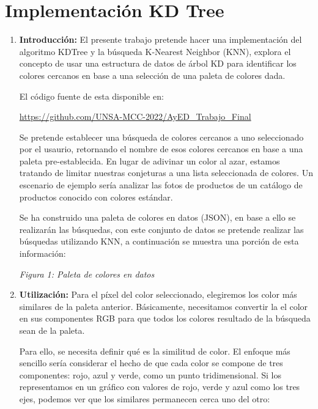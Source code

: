 \documentclass{article}
\begin{document}
	\section{Implementación KD Tree}\label{sec:trabajo}
	\begin{enumerate}
        
        \item \textbf{Introducción:}  El presente trabajo pretende hacer una implementación del algoritmo KDTree y la búsqueda K-Nearest Neighbor (KNN), explora el concepto de usar una estructura de datos de árbol KD para identificar los colores cercanos en base a una selección de una paleta de colores dada.

        El código fuente de esta disponible en: 
        
        \begin{center}
	        \url{https://github.com/UNSA-MCC-2022/AyED_Trabajo_Final}
	    \end{center}

        Se pretende establecer una búsqueda de colores cercanos a uno seleccionado por el usaurio, retornando el nombre de esos colores cercanos en base a una paleta pre-establecida. En lugar de adivinar un color al azar, estamos tratando de limitar nuestras conjeturas a una lista seleccionada de colores. Un escenario de ejemplo sería analizar las fotos de productos de un catálogo de productos conocido con colores estándar.
        
        Se ha construido una paleta de colores en datos (JSON), en base a ello se realizarán las búsquedas, con este conjunto de datos se pretende realizar las búsquedas utilizando KNN, a continuación se muestra una porción de esta información:
        
        \begin{center}
            \par
            \textit{Figura 1: Paleta de colores en datos}
        \end{center}
        
        \item \textbf{Utilización:}  Para el píxel del color seleccionado, elegiremos los color más similares de la paleta anterior. Básicamente, necesitamos convertir la el color en sus componentes RGB para que todos los colores resultado de la búsqueda sean de la paleta.

        Para ello, se necesita definir qué es la similitud de color. El enfoque más sencillo sería considerar el hecho de que cada color se compone de tres componentes: rojo, azul y verde, como un punto tridimensional. Si los representamos en un gráfico con valores de rojo, verde y azul como los tres ejes, podemos ver que los similares permanecen cerca uno del otro:


\end{enumerate}
\end{document}
